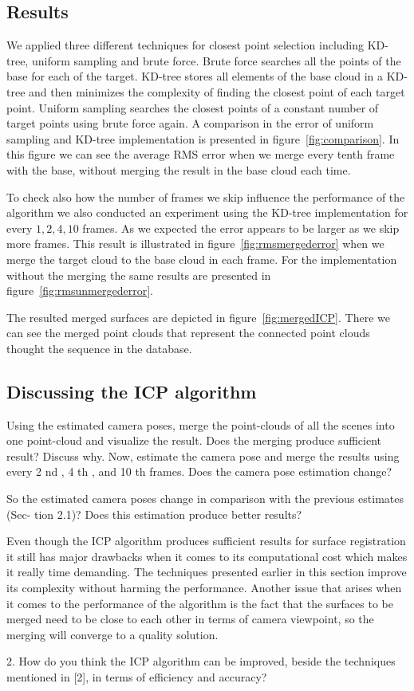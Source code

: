 \subsection{Results}
We applied three different techniques for closest point selection including KD-tree, uniform sampling and brute force. Brute force searches all the points of the base for each of the target. KD-tree stores all elements of the base cloud in a KD-tree and then minimizes the complexity of finding the closest point of each target point. Uniform sampling searches the closest points of a constant number of target points using brute force again. A comparison in the error of uniform sampling and KD-tree implementation is presented in figure~\ref{fig:comparison}. In this figure we can see the average RMS error when we merge every tenth frame with the base, without merging the result in the base cloud each time.

To check also how the number of frames we skip influence the performance of the algorithm we also conducted an experiment using the KD-tree implementation for every $1,2,4,10$ frames. As we expected the error appears to be larger as we skip more frames. This result is illustrated in figure~\ref{fig:rmsmergederror} when we merge the target cloud to the base cloud in each frame. For the implementation without the merging the same results are presented in figure~\ref{fig:rmsunmergederror}.

The resulted merged surfaces are depicted in figure~\ref{fig:mergedICP}. There we can see the merged point clouds that represent the connected point clouds thought the sequence in the database.


\subsection{Discussing the ICP algorithm}
Using the estimated camera poses, merge the point-clouds of all the scenes into one point-cloud and visualize the result. Does the merging produce sufficient result? Discuss why. Now, estimate the camera pose and merge the results using every 2 nd , 4 th , and 10 th frames. Does the camera pose estimation change?




So the estimated camera poses change in comparison with the previous estimates (Sec- tion 2.1)? Does this estimation produce better results?

Even though the ICP algorithm produces sufficient results for surface registration it still has major drawbacks when it comes to its computational cost which makes it really time demanding. The techniques presented earlier in this section improve its complexity without harming the performance. Another issue that arises when it comes to the performance of the algorithm is the fact that the surfaces to be merged need to be close to each other in terms of camera viewpoint, so the merging will converge to a quality solution.

2. How do you think the ICP algorithm can be improved, beside the techniques mentioned in [2], in terms of efficiency and accuracy?


